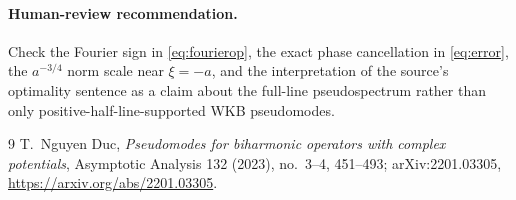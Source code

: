\documentclass[11pt]{article}
\begin{document}
\paragraph{Human-review recommendation.}
Check the Fourier sign in \eqref{eq:fourierop}, the exact phase cancellation
in \eqref{eq:error}, the $a^{-3/4}$ norm scale near $\xi=-a$, and the
interpretation of the source's optimality sentence as a claim about the
full-line pseudospectrum rather than only positive-half-line-supported WKB
pseudomodes.

\begin{thebibliography}{9}
T.~Nguyen Duc,
\emph{Pseudomodes for biharmonic operators with complex potentials},
Asymptotic Analysis 132 (2023), no.~3--4, 451--493;
arXiv:2201.03305,
\url{https://arxiv.org/abs/2201.03305}.
\end{thebibliography}
\end{document}
